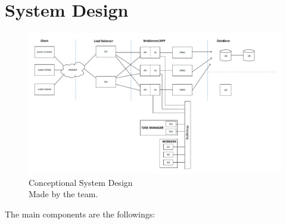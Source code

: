 \section{System Design}


\begin{figure}[!htbp]
	\includegraphics[width=0.95\textheight, angle=90]{figures/atfogo_rendszerterv_teljes.pdf}
	\caption[Conceptional System Design]{Conceptional System Design\\Made by the team.}
	\label{fig:conceptional-system-design}
\end{figure}


The main components are the followings:

